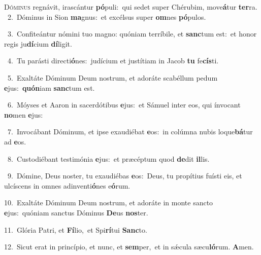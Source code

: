 \lettrine{\initial\textcolor{\initialcolor}{D}}{óminus} regnávit, irascántur \textbf{pó}\-puli:~\star qui sedet super Chérubim, move\-\textbf{á}\-tur \textbf{ter}\-ra.\\
{\numbfont\textcolor{\numbcolor}{~2.}}~Dóminus in Sion \textbf{ma}\-gnus:~\star et excélsus super \textbf{om}\-nes \textbf{pó}\-pulos.\par
{\numbfont\textcolor{\numbcolor}{~3.}}~Confiteántur nómini tuo magno: quóniam terríbile, et \textbf{sanc}\-tum est:~\star et honor regis ju\-\textbf{dí}\-cium \textbf{dí}\-ligit.\par
{\numbfont\textcolor{\numbcolor}{~4.}}~Tu parásti directi\-\textbf{ó}\-nes:~\star judícium et justítiam in Jacob \textbf{tu} fe\-\textbf{cís}\-ti.\par
{\numbfont\textcolor{\numbcolor}{~5.}}~Exaltáte Dóminum Deum nostrum, et adoráte scabéllum pedum \textbf{e}\-jus:~\star \textbf{quón}\-iam \textbf{sanc}\-tum est.\par
{\numbfont\textcolor{\numbcolor}{~6.}}~Móyses et Aaron in sacerdótibus \textbf{e}\-jus:~\star et Sámuel inter eos, qui ínvocant \textbf{no}\-men \textbf{e}\-jus:\par
{\numbfont\textcolor{\numbcolor}{~7.}}~Invocábant Dóminum, et ipse exaudiébat \textbf{e}\-os:~\star in colúmna nubis loque\-\textbf{bá}\-tur ad \textbf{e}\-os.\par
{\numbfont\textcolor{\numbcolor}{~8.}}~Custodiébant testimónia \textbf{e}\-jus:~\star et præcéptum quod \textbf{de}\-dit \textbf{il}\-lis.\par
{\numbfont\textcolor{\numbcolor}{~9.}}~Dómine, Deus noster, tu exaudiébas \textbf{e}\-os:~\star Deus, tu propítius fuísti eis, et ulcíscens in omnes adinventi\-\textbf{ó}\-nes e\-\textbf{ó}\-rum.\par
{\numbfont\textcolor{\numbcolor}{10.}}~Exaltáte Dóminum Deum nostrum, et adoráte in monte sancto \textbf{e}\-jus:~\star quóniam sanctus Dóminus \textbf{De}\-us \textbf{nos}\-ter.\par
{\numbfont\textcolor{\numbcolor}{11.}}~Glória Patri, et \textbf{Fí}\-lio,~\star et Spi\-\textbf{rí}\-tui \textbf{Sanc}\-to.\par
{\numbfont\textcolor{\numbcolor}{12.}}~Sicut erat in princípio, et nunc, et \textbf{sem}\-per,~\star et in sǽcula sæcu\-\textbf{ló}\-rum. \textbf{A}\-men.\par
